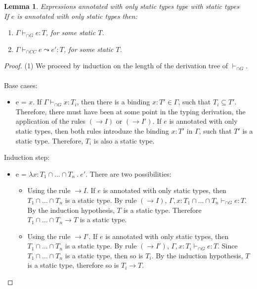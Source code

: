 \documentclass[a4paper]{article}
\newtheorem{lemma}{Lemma}
\begin{document}
\begin{lemma}
\label{staticexpressionstypestatic}
Expressions annotated with only static types type with static types\\
If $e$ is annotated with only static types then:
\begin{enumerate}
    \item $\Gamma \vdash_{\cap G} e : T$, for some static $T$.
    \item $\Gamma \vdash_{\cap CC} e \leadsto e' : T$, for some static $T$.
\end{enumerate}
\end{lemma}
\begin{proof}
(1) We proceed by induction on the length of the derivation tree of $\vdash_{\cap G}$.\\\\
Base cases:
\begin{itemize}
    \item e = $x$.
    If $\Gamma \vdash_{\cap G} x : T_i$, then there is a binding $x : T' \in \Gamma$, such that $T_i \subseteq T'$.
    Therefore, there must have been at some point in the typing derivation, the application of the rules $({\rightarrow} I)$ or $({\rightarrow} I')$. If $e$ is annotated with only static types, then both rules introduze the binding $x : T'$ in $\Gamma$, such that $T'$ is a static type. Therefore, $T_i$ is also a static type.
\end{itemize}
Induction step:
\begin{itemize}
    \item e = $\lambda x : T_1 \cap \ldots \cap T_n\ .\ e'$.
    There are two possibilities:
    \begin{itemize}
        \item Using the rule ${\rightarrow} I$.
        If $e$ is annotated with only static types, then $T_1 \cap \ldots \cap T_n$ is a static type.
        By rule $({\rightarrow} I)$, $\Gamma, x : T_1 \cap \ldots \cap T_n \vdash_{\cap G} e : T$.
        By the induction hypothesis, $T$ is a static type.
        Therefore $T_1 \cap \ldots \cap T_n \rightarrow T$ is a static type.
        \item Using the rule ${\rightarrow} I'$.
        If $e$ is annotated with only static types, then $T_1 \cap \ldots \cap T_n$ is a static type.
        By rule $({\rightarrow} I')$, $\Gamma, x : T_i \vdash_{\cap G} e : T$.
        Since $T_1 \cap \ldots \cap T_n$ is a static type, then so is $T_i$.
        By the induction hypothesis, $T$ is a static type, therefore so is $T_i \rightarrow T$.

\end{itemize}
\end{itemize}
\end{proof}
\end{document}

